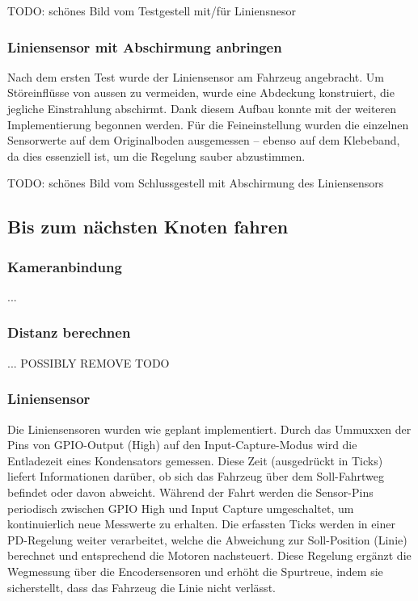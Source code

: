 TODO: schönes Bild vom Testgestell mit/für Liniensnesor

\subsubsection{Liniensensor mit Abschirmung anbringen}

Nach dem ersten Test wurde der Liniensensor am Fahrzeug angebracht. Um Störeinflüsse von aussen zu vermeiden, wurde eine Abdeckung konstruiert, die jegliche Einstrahlung abschirmt. Dank diesem Aufbau konnte mit der weiteren Implementierung begonnen werden. Für die Feineinstellung wurden die einzelnen Sensorwerte auf dem Originalboden ausgemessen – ebenso auf dem Klebeband, da dies essenziell ist, um die Regelung sauber abzustimmen.



TODO: schönes Bild vom Schlussgestell mit Abschirmung des Liniensensors


\newpage

\subsection{Bis zum nächsten Knoten fahren}

\subsubsection{Kameranbindung}

...

\subsubsection{Distanz berechnen}

... POSSIBLY REMOVE TODO

\subsubsection{Liniensensor}

Die Liniensensoren wurden wie geplant implementiert. Durch das Ummuxxen der Pins von GPIO-Output (High) auf den Input-Capture-Modus wird die Entladezeit eines Kondensators gemessen. Diese Zeit (ausgedrückt in Ticks) liefert Informationen darüber, ob sich das Fahrzeug über dem Soll-Fahrtweg befindet oder davon abweicht. Während der Fahrt werden die Sensor-Pins periodisch zwischen GPIO High und Input Capture umgeschaltet, um kontinuierlich neue Messwerte zu erhalten. Die erfassten Ticks werden in einer PD-Regelung weiter verarbeitet, welche die Abweichung zur Soll-Position (Linie) berechnet und entsprechend die Motoren nachsteuert. Diese Regelung ergänzt die Wegmessung über die Encodersensoren und erhöht die Spurtreue, indem sie sicherstellt, dass das Fahrzeug die Linie nicht verlässt.